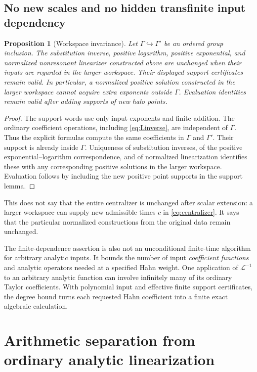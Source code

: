 \documentclass[11pt,letterpaper]{article}
\newtheorem{proposition}[proposition]{Proposition}
\theoremstyle{definition}
\theoremstyle{remark}
\newcommand{\Li}{\mathcal L}
\numberwithin{equation}{section}
\begin{document}
\subsection{No new scales and no hidden transfinite input dependency}
\begin{proposition}[Workspace invariance]\label{prop:workspace}
Let $\Gamma\hookrightarrow\Gamma'$ be an ordered group inclusion. The
substitution inverse, positive logarithm, positive exponential, and normalized
nonresonant linearizer constructed above are unchanged when their inputs are
regarded in the larger workspace. Their displayed support certificates
remain valid. In particular, a normalized positive solution constructed in
the larger workspace cannot acquire extra exponents outside $\Gamma$.
Evaluation identities remain valid after adding supports of new halo points.
\end{proposition}
\begin{proof}
The support words use only input exponents and finite addition. The ordinary
coefficient operations, including \eqref{eq:Linverse}, are independent of
$\Gamma$. Thus the explicit formulas compute the same coefficients in
$\Gamma$ and $\Gamma'$. Their support is already inside $\Gamma$.
Uniqueness of substitution inverses, of the positive exponential--logarithm
correspondence, and of normalized linearization identifies these with any
corresponding positive solutions in the larger workspace. Evaluation follows
by including the new positive point supports in the support lemma.
\end{proof}

This does not say that the entire centralizer is unchanged after scalar
extension: a larger workspace can supply new admissible times $c$ in
\eqref{eq:centralizer}. It says that the particular normalized constructions
from the original data remain unchanged.

The finite-dependence assertion is also not an unconditional finite-time
algorithm for arbitrary analytic inputs. It bounds the number of input
\emph{coefficient functions} and analytic operators needed at a specified
Hahn weight. One application of $\Li^{-1}$ to an arbitrary analytic
function can involve infinitely many of its ordinary Taylor coefficients.
With polynomial input and effective finite support certificates, the degree
bound turns each requested Hahn coefficient into a finite exact algebraic
calculation.

\section{Arithmetic separation from ordinary analytic linearization}
\label{sec:arithmetic}
\end{document}
